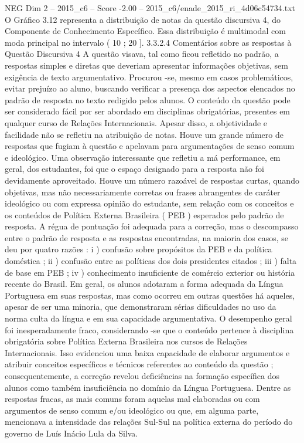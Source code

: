 \begin{textsample}{NEG Dim 2 – 2015\_c6 – Score -2.00 – 2015\_c6/enade\_2015\_ri\_4d06c54734.txt}
O Gráfico 3.12 representa a distribuição de notas da questão discursiva 4, do Componente de Conhecimento Específico.
Essa distribuição é multimodal com moda principal no intervalo ( 10 ; 20 ]. 3.3.2.4 Comentários sobre as respostas à Questão Discursiva 4 A questão visava, tal como ficou refletido no padrão, a respostas simples e diretas que deveriam apresentar informações objetivas, sem exigência de texto argumentativo.
Procurou -se, mesmo em casos problemáticos, evitar prejuízo ao aluno, buscando verificar a presença dos aspectos elencados no padrão de resposta no texto redigido pelos alunos.
O conteúdo da questão pode ser considerado fácil por ser abordado em disciplinas obrigatórias, presentes em qualquer curso de Relações Internacionais.
Apesar disso, a objetividade e facilidade não se refletiu na atribuição de notas.
Houve um grande número de respostas que fugiam à questão e apelavam para argumentações de senso comum e ideológico.
Uma observação interessante que refletiu a má performance, em geral, dos estudantes, foi que o espaço designado para a resposta não foi devidamente aproveitado.
Houve um número razoável de respostas curtas, quando objetivas, mas não necessariamente corretas ou frases abrangentes de caráter ideológico ou com expressa opinião do estudante, sem relação com os conceitos e os conteúdos de Política Externa Brasileira ( PEB ) esperados pelo padrão de resposta.
A régua de pontuação foi adequada para a correção, mas o descompasso entre o padrão de resposta e as respostas encontradas, na maioria dos casos, se deu por quatro razões : i ) confusão sobre propósitos da PEB e da política doméstica ; ii ) confusão entre as políticas dos dois presidentes citados ; iii ) falta de base em PEB ; iv ) conhecimento insuficiente de comércio exterior ou história recente do Brasil.
Em geral, os alunos adotaram a forma adequada da Língua Portuguesa em suas respostas, mas como ocorreu em outras questões há aqueles, apesar de ser uma minoria, que demonstraram sérias dificuldades no uso da norma culta da língua e em sua capacidade argumentativa.
O desempenho geral foi inesperadamente fraco, considerando -se que o conteúdo pertence à disciplina obrigatória sobre Política Externa Brasileira nos cursos de Relações Internacionais.
Isso evidenciou uma baixa capacidade de elaborar argumentos e atribuir conceitos específicos e técnicos referentes ao conteúdo da questão ; consequentemente, a correção revelou deficiências na formação específica dos alunos como também insuficiência no domínio da Língua Portuguesa.
Dentre as respostas fracas, as mais comuns foram aquelas mal elaboradas ou com argumentos de senso comum e/ou ideológico ou que, em alguma parte, mencionava a intensidade das relações Sul-Sul na política externa do período do governo de Luís Inácio Lula da Silva.

\end{textsample}
